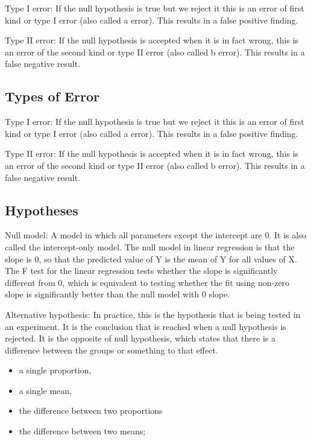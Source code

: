 
\begin{minipage}[b]{0.5\linewidth}
Type I error: If the null hypothesis is true but we reject it this is an error of first kind or type I error (also called a error). This results in a false positive finding.

Type II error: If the null hypothesis is accepted when it is in fact wrong, this is an error of the second kind or type II error (also called b error). This results in a false negative result.
\end{minipage}

\subsection{Types of Error}
Type I error: If the null hypothesis is true but we reject it this is an error of first kind or type I error (also called a error). This results in a false positive finding.

Type II error: If the null hypothesis is accepted when it is in fact wrong, this is an error of the second kind or type II error (also called b error). This results in a false negative result.

\subsection{Hypotheses}

Null model: A model in which all parameters except the intercept are 0. It is also called the intercept-only model. The null model in linear regression is that the slope is 0, so that the predicted value of Y is the mean of Y for all values of X. The F test for the linear regression tests whether the slope is significantly different from 0, which is equivalent to testing whether the fit using non-zero slope is significantly better than the null model with 0 slope.

Alternative hypothesis: In practice, this is the hypothesis that is being tested in an experiment. It is the conclusion that is reached when a null hypothesis is rejected. It is the opposite of null hypothesis, which states that there is a difference between the groups or something to that effect.


\begin{itemize}
\item a single proportion,
\item a single mean,
\item the difference between two proportions	
\item the difference between two means;
\end{itemize}

